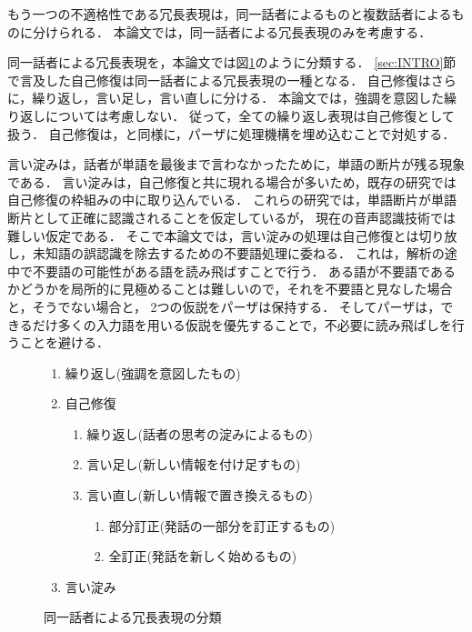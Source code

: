 もう一つの不適格性である冗長表現は，同一話者によるものと複数話者によるものに分けられる\cite{KM1996}．
本論文では，同一話者による冗長表現のみを考慮する．


同一話者による冗長表現を，本論文では図\ref{fig:RD_CLASS}のように分類する．
\ref{sec:INTRO}節で言及した自己修復は同一話者による冗長表現の一種となる．
自己修復はさらに，繰り返し，言い足し，言い直しに分ける．
本論文では，強調を意図した繰り返しについては考慮しない．
従って，全ての繰り返し表現は自己修復として扱う．
自己修復は，\cite{HD1983}と同様に，パーザに処理機構を埋め込むことで対処する．

言い淀みは，話者が単語を最後まで言わなかったために，単語の断片が残る現象である．
言い淀みは，自己修復と共に現れる場合が多いため，既存の研究では自己修復の枠組みの中に取り込んでいる．
これらの研究では，単語断片が単語断片として正確に認識されることを仮定しているが，
現在の音声認識技術では難しい仮定である．
そこで本論文では，言い淀みの処理は自己修復とは切り放し，未知語の誤認識を除去するための不要語処理に委ねる．
これは，解析の途中で不要語の可能性がある語を読み飛ばすことで行う．
ある語が不要語であるかどうかを局所的に見極めることは難しいので，それを不要語と見なした場合と，そうでない場合と，
2つの仮説をパーザは保持する．
そしてパーザは，できるだけ多くの入力語を用いる仮説を優先することで，不必要に読み飛ばしを行うことを避ける．

\begin{figure}
\begin{center}
\begin{minipage}{.5\linewidth}
\small
\begin{enumerate}
\item 繰り返し(強調を意図したもの)
\item 自己修復
  \begin{enumerate}
  \item 繰り返し(話者の思考の淀みによるもの)
  \item 言い足し(新しい情報を付け足すもの)
  \item 言い直し(新しい情報で置き換えるもの)
    \begin{enumerate}
    \item 部分訂正(発話の一部分を訂正するもの)
    \item 全訂正(発話を新しく始めるもの)
\end{enumerate}
\end{enumerate}
\item 言い淀み
\end{enumerate}
\end{minipage}
\end{center}
\caption{同一話者による冗長表現の分類}
\label{fig:RD_CLASS}
\end{figure}

